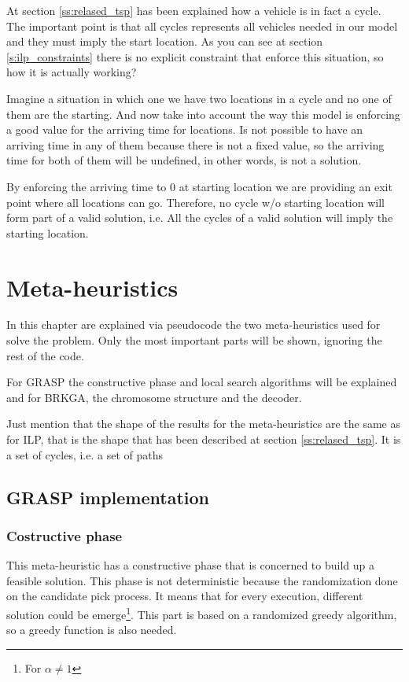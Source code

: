 \documentclass[]{report}
\begin{document}
At section \ref{ss:relased_tsp} has been explained how a vehicle is in fact a cycle. The important point is that all cycles represents all vehicles needed in our model and they must imply the start location. As you can see at section \ref{s:ilp_constraints} there is no explicit constraint that enforce this situation, so how it is actually  working?

Imagine a situation in which one we have two locations in a cycle and no one of them are the starting. And now take into account the way this model is enforcing a good value for the arriving time for locations. Is not possible to have an arriving time in any of them because there is not a fixed value, so the arriving time for both of them will be undefined, in other words, is not a solution.

By enforcing the arriving time to $0$ at starting location we are providing an exit point where all locations can go. Therefore, no cycle w/o starting location will form part of a valid solution, i.e. All the cycles of a valid solution will imply the starting location.

\chapter{Meta-heuristics}\label{ch:meta_heuristics}

In this chapter are explained via pseudocode the two meta-heuristics used for solve the problem. Only the most important parts will be shown, ignoring the rest of the code.

For GRASP the constructive phase and local search algorithms will be explained and for BRKGA, the chromosome structure and the decoder.

Just mention that the shape of the results for the meta-heuristics are the same as for ILP, that is the shape that has been described at section \ref{ss:relased_tsp}. It is a set of cycles, i.e. a set of paths

\section{GRASP implementation}
\subsection{Costructive phase}
This meta-heuristic has a constructive phase that is concerned to build up a feasible solution. This phase is not deterministic because the randomization done on the candidate pick process. It means that for every execution, different solution could be emerge\footnote{For $\alpha \neq 1$}. This part is based on a randomized greedy algorithm, so a greedy function is also needed.
\end{document}

